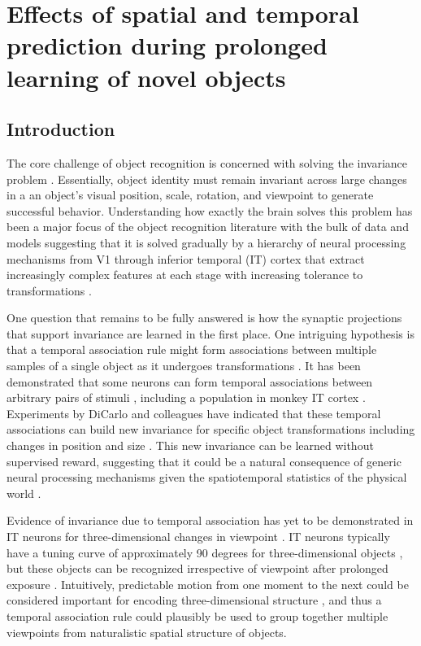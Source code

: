 \documentclass[dwyatte_dissertation.tex]{subfiles}
\begin{document}
\sloppy

\chapter{Effects of spatial and temporal prediction during prolonged learning of novel objects}
\label{chap:bpleast}

\section{Introduction}
The core challenge of object recognition is concerned with solving the invariance problem \cite{DicarloZoccolanRust12}. Essentially, object identity must remain invariant across large changes in a an object's visual position, scale, rotation, and viewpoint to generate successful behavior. Understanding how exactly the brain solves this problem has been a major focus of the object recognition literature with the bulk of data and models suggesting that it is solved gradually by a hierarchy of neural processing mechanisms from V1 through inferior temporal (IT) cortex that extract increasingly complex features at each stage with increasing tolerance to transformations \cite{Fukushima80,RiesenhuberPoggio99,WallisRolls97,MasquelierThorpe07,OReillyWyatteHerdEtAl13}.

One question that remains to be fully answered is how the synaptic projections that support invariance are learned in the first place. One intriguing hypothesis is that a temporal association rule might form associations between multiple samples of a single object as it undergoes transformations \cite{StringerPerryRollsEtAl06,WallisBaddeley97,IsikLeiboPoggio12}. It has been demonstrated that some neurons can form temporal associations between arbitrary pairs of stimuli \cite{SakaiMiyashita91}, including a population in monkey IT cortex \cite{MeyerOlson11}. Experiments by DiCarlo and colleagues have indicated that these temporal associations can build new invariance for specific object transformations including changes in position and size \cite{CoxMeierOerteltEtAl05,LiDiCarlo08,LiDiCarlo10}. This new invariance can be learned without supervised reward, suggesting that it could be a natural consequence of generic neural processing mechanisms given the spatiotemporal statistics of the physical world \cite{LiDiCarlo12}.

Evidence of invariance due to temporal association has yet to be demonstrated in IT neurons for three-dimensional changes in viewpoint \cite[although see][for relevant human behavioral work]{WallisBulthoff01,WallisBackusLangerEtAl09}. IT neurons typically have a tuning curve of approximately 90 degrees for three-dimensional objects \cite{LogothetisPaulsBulthoffEtAl94,LogothetisPaulsPoggio95}, but these objects can be recognized irrespective of viewpoint after prolonged exposure \cite{WallisBulthoff99,EdelmanBulthoff92,TarrGauthier98}. Intuitively, predictable motion from one moment to the next could be considered important for encoding three-dimensional structure \cite{LawsonHumphreysWatson94,Stone98,VuongTarr04,BalasSinha09b,BalasSinha09c,ChuangVuongBulthoff12}, and thus a temporal association rule could plausibly be used to group together multiple viewpoints from naturalistic spatial structure of objects.
\end{document}
